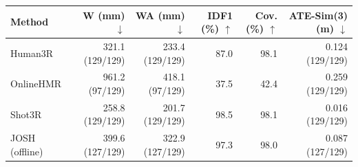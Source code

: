 \begin{tabular}{lrrrrr}
\toprule
Method & W (mm) $\downarrow$ & WA (mm) $\downarrow$ & IDF1 (\%) $\uparrow$ & Cov. (\%) $\uparrow$ & ATE-Sim(3) (m) $\downarrow$ \\
\midrule
Human3R & 321.1 (129/129) & 233.4 (129/129) & 87.0 & 98.1 & 0.124 (129/129) \\
OnlineHMR & 961.2 (97/129) & 418.1 (97/129) & 37.5 & 42.4 & 0.259 (129/129) \\
Shot3R & 258.8 (129/129) & 201.7 (129/129) & 98.5 & 98.1 & 0.016 (129/129) \\
\midrule
JOSH (offline) & 399.6 (127/129) & 322.9 (127/129) & 97.3 & 98.0 & 0.087 (127/129) \\
\bottomrule
\end{tabular}

